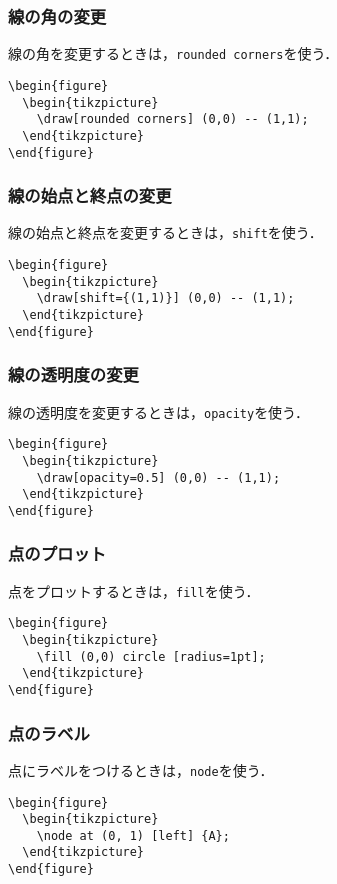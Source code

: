 \subsubsection{線の角の変更}
線の角を変更するときは，\texttt{rounded corners}を使う．
\begin{lstlisting}
\begin{figure}
  \begin{tikzpicture}
    \draw[rounded corners] (0,0) -- (1,1);
  \end{tikzpicture}
\end{figure}
\end{lstlisting}
\subsubsection{線の始点と終点の変更}
線の始点と終点を変更するときは，\texttt{shift}を使う．
\begin{lstlisting}
\begin{figure}
  \begin{tikzpicture}
    \draw[shift={(1,1)}] (0,0) -- (1,1);
  \end{tikzpicture}
\end{figure}
\end{lstlisting}
\newpage
\subsubsection{線の透明度の変更}
線の透明度を変更するときは，\texttt{opacity}を使う．
\begin{lstlisting}
\begin{figure}
  \begin{tikzpicture}
    \draw[opacity=0.5] (0,0) -- (1,1);
  \end{tikzpicture}
\end{figure}
\end{lstlisting}
\subsubsection{点のプロット}
点をプロットするときは，\texttt{fill}を使う．
\begin{lstlisting}
\begin{figure}
  \begin{tikzpicture}
    \fill (0,0) circle [radius=1pt];
  \end{tikzpicture}
\end{figure}
\end{lstlisting}
\subsubsection{点のラベル}
点にラベルをつけるときは，\texttt{node}を使う．
\begin{lstlisting}
\begin{figure}
  \begin{tikzpicture}
    \node at (0, 1) [left] {A};
  \end{tikzpicture}
\end{figure}
\end{lstlisting}
\newpage
